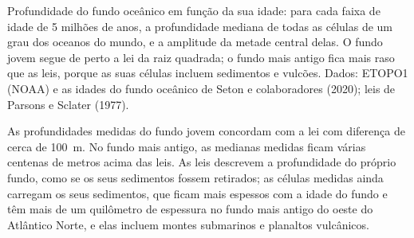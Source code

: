 \begin{omfigure}

{\small Profundidade do fundo oceânico em função da sua idade: para cada
faixa de idade de 5 milhões de anos, a profundidade mediana de todas as
células de um grau dos oceanos do mundo, e a amplitude da metade central
delas. O fundo jovem segue de perto a lei da raiz quadrada; o fundo mais
antigo fica mais raso que as leis, porque as suas células incluem
sedimentos e vulcões. Dados: ETOPO1 (NOAA) e as idades do fundo oceânico de
Seton e colaboradores (2020); leis de Parsons e Sclater (1977).}
\end{omfigure}

As profundidades medidas do fundo jovem concordam com a lei com diferença de
cerca de \qty{100}{m}. No fundo mais antigo, as medianas medidas ficam
várias centenas de metros acima das leis. As leis descrevem a profundidade
do próprio fundo, como se os seus sedimentos fossem retirados; as células
medidas ainda carregam os seus sedimentos, que ficam mais espessos com a
idade do fundo e têm mais de um quilômetro de espessura no fundo mais
antigo do oeste do Atlântico Norte, e elas incluem montes submarinos e
planaltos vulcânicos.

